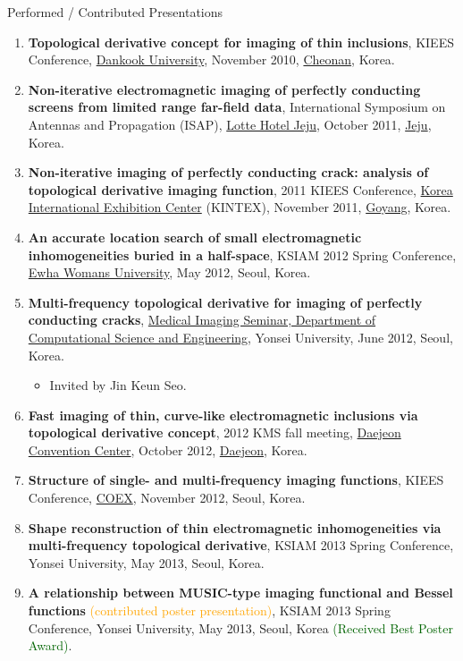 \documentclass{resume} %
\begin{document}
\begin{rSection}{Performed / Contributed Presentations}
\begin{enumerate}
\item\label{P-KIEES2010} \textbf{Topological derivative concept for imaging of thin inclusions}, KIEES Conference, \href{https://www.dankook.ac.kr/web/kor}{Dankook University}, November 2010, \href{https://www.cheonan.go.kr}{Cheonan}, Korea.
\item\label{P-ISAP2011} \textbf{Non-iterative electromagnetic imaging of perfectly conducting screens from limited range far-field data}, International Symposium on Antennas and Propagation (ISAP), \href{https://www.lottehotel.com/jeju-hotel/en.html}{Lotte Hotel Jeju}, October 2011, \href{https://www.jejusi.go.kr/}{Jeju}, Korea.
\item\label{P-KIEES2011} \textbf{Non-iterative imaging of perfectly conducting crack: analysis of topological derivative imaging function}, 2011 KIEES Conference, \href{https://www.kintex.com}{Korea International Exhibition Center} (KINTEX), November 2011, \href{http://www.goyang.go.kr/}{Goyang}, Korea.
\item\label{P-KSIAM2012} \textbf{An accurate location search of small electromagnetic inhomogeneities buried in a half-space}, KSIAM 2012 Spring Conference, \href{http://www.ewha.ac.kr/ewha/index.do}{Ewha Womans University}, May 2012, Seoul, Korea.
\item\label{P-MIS2012} \textbf{Multi-frequency topological derivative for imaging of perfectly conducting cracks}, \href{https://web.yonsei.ac.kr/misg/seminar29th.htm}{ Medical Imaging Seminar, Department of Computational Science and Engineering}, Yonsei University, June 2012, Seoul, Korea.
\begin{itemize}
\item Invited by Jin Keun Seo.
\end{itemize}
\item\label{P-KMS2012} \textbf{Fast imaging of thin, curve-like electromagnetic inclusions via topological derivative concept}, 2012 KMS fall meeting, \href{http://www.dcckorea.or.kr/}{Daejeon Convention Center}, October 2012, \href{https://www.daejeon.go.kr}{Daejeon}, Korea.
\item\label{P-KIEES2012} \textbf{Structure of single- and multi-frequency imaging functions}, KIEES Conference, \href{http://www.coex.co.kr/}{COEX}, November 2012, Seoul, Korea.
\item\label{P-KSIAM2013A} \textbf{Shape reconstruction of thin electromagnetic inhomogeneities via multi-frequency topological derivative}, KSIAM 2013 Spring Conference, Yonsei University, May 2013, Seoul, Korea.
\item\label{P-KSIAM2013B} \textbf{A relationship between MUSIC-type imaging functional and Bessel functions} \textcolor{orange}{(contributed poster presentation)}, KSIAM 2013 Spring Conference, Yonsei University, May 2013, Seoul, Korea \textcolor{darkgreen}{(Received Best Poster Award)}.

\end{enumerate}
\end{rSection}
\end{document}
